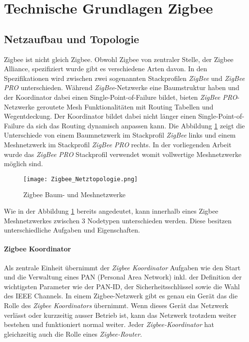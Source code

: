 \clearpage
\section{Technische Grundlagen Zigbee}\label{sec:TechnischeGrundlagenZigbee}

\subsection{Netzaufbau und Topologie}\label{subsec:NetzaufbauundTopologie}


Zigbee ist nicht gleich Zigbee. Obwohl Zigbee von zentraler Stelle, der Zigbee Alliance, spezifiziert wurde gibt es verschiedene Arten davon. In den Spezifikationen wird zwischen zwei sogenannten Stackprofilen \textit{ZigBee} und \textit{ZigBee PRO} unterschieden.
Während \textit{ZigBee}-Netzwerke eine Baumstruktur haben und der Koordinator dabei einen Single-Point-of-Failure bildet, bieten \textit{ZigBee PRO}-Netzwerke geroutete Mesh Funktionalitäten mit Routing Tabellen und Wegentdeckung. Der Koordinator bildet dabei nicht länger einen Single-Point-of-Failure da sich das Routing dynamisch anpassen kann.
Die Abbildung \ref{fig:NetzwerktopologienZigbee} zeigt die Unterschiede von einem Baumnetzwerk im Stackprofil \textit{ZigBee} links und einem Meshnetzwerk im Stackprofil \textit{ZigBee PRO} rechts.
In der vorliegenden Arbeit wurde das \textit{ZigBee PRO} Stackprofil verwendet womit vollwertige Meshnetzwerke möglich sind.

\begin{figure}[h]
	\centering
	\texttt{[image: Zigbee\_Netztopologie.png]}
	\caption{Zigbee Baum- und Meshnetzwerke \cite[S.~221]{markus_krause_rainer_konrad_zigbee_2014}}	\label{fig:NetzwerktopologienZigbee}
\end{figure}

Wie in der Abbildung \ref{fig:NetzwerktopologienZigbee} bereits angedeutet, kann innerhalb eines Zigbee Meshnetzwerkes zwischen 3 Nodetypen unterschieden werden. Diese besitzen unterschiedliche Aufgaben und Eigenschaften.

\paragraph{Zigbee Koordinator}\label{par:ZigbeeKoordinator}
Als zentrale Einheit übernimmt der \textit{Zigbee Koordinator} Aufgaben wie den Start und die Verwaltung eines PAN (Personal Area Network) inkl. der Definition der wichtigsten Parameter wie der PAN-ID, der Sicherheitsschlüssel sowie die Wahl des IEEE Channels.
In einem Zigbee-Netzwerk gibt es genau ein Gerät das die Rolle des \textit{Zigbee Koordinators} übernimmt. Wenn dieses Gerät das Netzwerk verlässt oder kurzzeitig ausser Betrieb ist, kann das Netzwerk trotzdem weiter bestehen und funktioniert normal weiter.
Jeder \textit{Zigbee-Koordinator} hat gleichzeitig auch die Rolle eines \textit{Zigbee-Router}.

